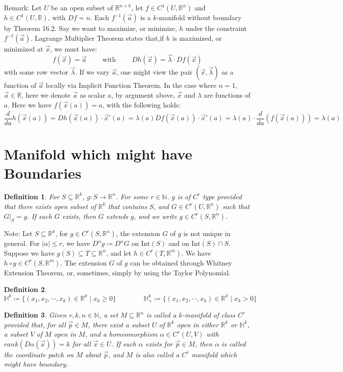 \documentclass[15pt]{book}
\theoremstyle{break}
\theoremstyle{break}
\newtheorem{defn}{Definition}[corL]
\newcommand{\R}{\mathbb{R}}
\newcommand{\N}{\mathbb{N}}
\newcommand{\Int}{\text{Int}}
\newcommand{\note}{\color{red}Note: \color{black}}
\newcommand{\remark}{\color{blue}Remark: \color{black}}
\begin{document}
\remark Let $U$ be an open subset of $\R^{n+k}$, let $f\in C^1(U,\R^n)$ and $h \in C^1(U,\R)$, with $Df = n$. Each $f^{-1}(\vec{a})$ is a $k$-manifold without boundary by Theorem 16.2. Say we want to maximize, or minimize, $h$ under the constraint $f^{-1}(\vec{a})$. Lagrange Multiplier Theorem states that,if $h$ is maximized, or minimized at $\vec{x}$, we must have: $$f(\vec{x}) = \vec{a} \qquad\text{ with }\qquad Dh(\vec{x}) =\vec{\lambda}\cdot Df(\vec{x})$$ 
with some row vector $\vec{\lambda}$. If we vary $\vec{a}$, one might view the pair $(\vec{x},\vec{\lambda})$ as a function of $\vec{a}$ locally via Implicit Function Theorem. In the case where $n=1$, $\vec{a}\in \R$, here we denote $\vec{a}$ as scalar $a$, by argument above, $\vec{x}$ and $\lambda$ are functions of $a$. Here we have $f(\vec{x}(a)) = a$, with the following holds:
$$\frac{d}{da}h(\vec{x}(a)) = Dh(\vec{x}(a) ) \cdot \vec{x}'(a) = \lambda(a) Df(\vec{x}(a))\cdot \vec{x}'(a) = \lambda(a) \cdot \frac{d}{da}(f(\vec{x}(a))) = \lambda(a)$$

\newpage
\section[Manifolds which might have Boundaries]{\color{red}Manifold which might have Boundaries\color{black}}
\begin{defn}
For $S \subseteq \R^k$, $g:S \to \R^n$. For some $r \in \N$. $g$ is of $C^r$ type provided that there exists open subset of $\R^k$ that contains $S$, and $G \in C^r(U,\R^n)$ such that $G|_S = g$. If such $G$ exists, then $G$ extends $g$, and we write $g\in C^r(S,\R^n)$.
\end{defn}
\note Let $S\subseteq \R^k$, for $g\in C^r(S,\R^n)$, the extension $G$ of $g$ is not unique in general. For $|\alpha| \leq r$, we have $D^\alpha g \coloneqq D^\alpha G$ on $\Int(S)$ and on $\overline{\Int(S)}\cap S$. Suppose we have $g(S) \subseteq T \subseteq \R^n$, and let $h\in C^r(T,\R^m)$. We have $h\circ g \in C^r(S,\R^m)$. The extension $G$ of $g$ can be obtained through Whitney Extension Theorem, or, sometimes, simply by using the Taylor Polynomial. \\


\begin{defn}
$$\mathbb{H}^k\coloneqq \{(x_1,x_2,\cdots,x_k)\in \R^k \mid x_k \geq 0\} \qquad\qquad \mathbb{H}_+^k \coloneqq \{(x_1,x_2,\cdots,x_k)\in \R^k \mid x_k > 0\}$$
\end{defn}
\hfill\break
\begin{defn}
Given $r,k,n \in \N$, a set $M \subseteq \R^n$ is called a $k$-manifold of class $C^r$ provided that, for all $\vec{p}\in M$, there exist a subset $U$ of $\R^k$ open in either $\R^k$ or $\mathbb{H}^k$, a subset $V$ of $M$ open in $M$, and a homeomorphism $\alpha \in C^r(U,V)$ with $rank(D\alpha(\vec{x})) = k$ for all $\vec{x}\in U$. If such $\alpha$ exists for $\vec{p}\in M$, then $\alpha$ is called the coordinate patch on $M$ about $\vec{p}$, and $M$ is also called a $C^r$ manifold which might have  boundary. 
\end{defn}
\end{document}
